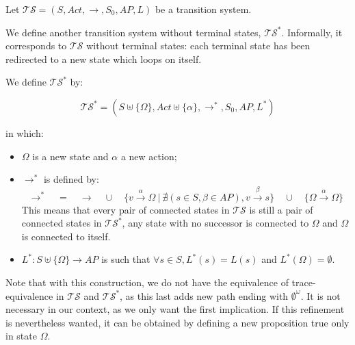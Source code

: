 \documentclass[11pt,a4paper]{article}
\def\ts{\mathcal{TS}}
\def\tss{\mathcal{TS^*}}
\begin{document}
\begin{Answer}
\Question%
Let $\ts=(S,\mathit{Act},\rightarrow,S_0,\mathit{AP},L)$ be a transition system.

We define another transition system without terminal states, $\tss$. Informally, it corresponds to $\ts$ without terminal states: each terminal state has been redirected to a new state which loops on itself.

We define $\ts^*$ by:

$$\tss=(S\uplus\{\Omega\},\mathit{Act}\uplus\{\alpha\},\rightarrow^*,S_0,\mathit{AP},L^*)$$

in which:
\begin{itemize}
	\item $\Omega$ is a new state and $\alpha$ a new action;
	\item $\rightarrow^*$ is defined by:
		$$\rightarrow^*\quad=\quad\rightarrow\quad\cup\quad\{v\xrightarrow{\alpha} \Omega~|~\nexists (s\in S, \beta\in\mathit{AP}), v\xrightarrow{\beta}s\}\quad\cup\quad\{\Omega\xrightarrow{\alpha}\Omega\}$$%
		This means that every pair of connected states in $\mathcal{TS}$ is still a pair of connected states in $\mathcal{TS^*}$, any state with no successor is connected to $\Omega$ and $\Omega$ is connected to itself.
	\item $L^* : S\uplus\{\Omega\} \to \mathit{AP}$ is such that $\forall s\in S,  L^*(s) = L(s)$ and $L^*(\Omega) = \emptyset$.
\end{itemize}

Note that with this construction, we do not have the equivalence of trace-equivalence in $\ts$ and $\tss$, as this last adds new path ending with $\emptyset^\omega$.
It is not necessary in our context, as we only want the first implication. If this refinement is nevertheless wanted, it can be obtained by defining a new proposition true only in state $\Omega$. %


\end{Answer}
\end{document}
